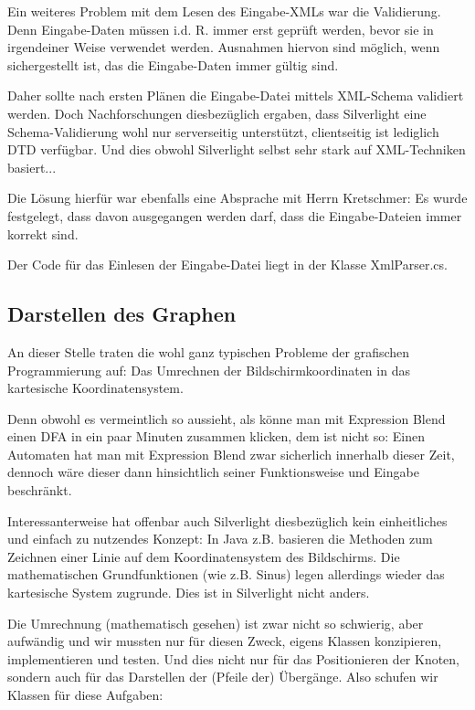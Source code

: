 Ein weiteres Problem mit dem Lesen des Eingabe-XMLs war die Validierung. Denn
Eingabe-Daten müssen i.d. R. immer erst geprüft werden, bevor sie in
irgendeiner Weise verwendet werden. Ausnahmen hiervon sind möglich, wenn
sichergestellt ist, das die Eingabe-Daten immer gültig sind.

Daher sollte nach ersten Plänen die Eingabe-Datei mittels XML-Schema validiert
werden. Doch Nachforschungen diesbezüglich ergaben, dass Silverlight eine
Schema-Validierung wohl nur serverseitig unterstützt, clientseitig ist
lediglich DTD verfügbar. Und dies obwohl Silverlight selbst sehr stark auf
XML-Techniken basiert...

Die Lösung hierfür war ebenfalls eine Absprache mit Herrn Kretschmer: Es wurde
festgelegt, dass davon ausgegangen werden darf, dass die Eingabe-Dateien immer
korrekt sind.

Der Code für das Einlesen der Eingabe-Datei liegt in der Klasse XmlParser.cs.

\subsection{Darstellen des Graphen}
An dieser Stelle traten die wohl ganz typischen Probleme der grafischen
Programmierung auf: Das Umrechnen der Bildschirmkoordinaten in das kartesische
Koordinatensystem.

Denn obwohl es vermeintlich so aussieht, als könne man mit Expression Blend
einen DFA in ein paar Minuten zusammen klicken, dem ist nicht so: Einen
Automaten hat man mit Expression Blend zwar sicherlich innerhalb dieser Zeit,
dennoch wäre dieser dann hinsichtlich seiner Funktionsweise und Eingabe
beschränkt.

Interessanterweise hat offenbar auch Silverlight diesbezüglich kein
einheitliches und einfach zu nutzendes Konzept: In Java z.B. basieren die
Methoden zum Zeichnen einer Linie auf dem Koordinatensystem des Bildschirms.
Die mathematischen Grundfunktionen (wie z.B. Sinus) legen allerdings wieder das
kartesische System zugrunde. Dies ist in Silverlight nicht anders.

Die Umrechnung (mathematisch gesehen) ist zwar nicht so schwierig, aber
aufwändig und wir mussten nur für diesen Zweck, eigens Klassen konzipieren,
implementieren und testen. Und dies nicht nur für das Positionieren der Knoten,
sondern auch für das Darstellen der (Pfeile der) Übergänge. Also schufen wir
Klassen für diese Aufgaben:

